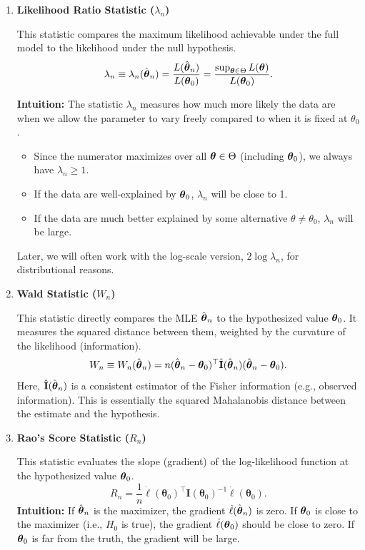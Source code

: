 \begin{enumerate}[label=\alph*)]
    \item \textbf{Likelihood Ratio Statistic ($\lambda_n$)}
    
    This statistic compares the maximum likelihood achievable under the full model to the likelihood under the null hypothesis.
    \[ \lambda_n \equiv \lambda_n(\hat{\boldsymbol{\theta}}_n) = \frac{L(\hat{\boldsymbol{\theta}}_n)}{L(\boldsymbol{\theta}_0)} = \frac{\sup_{\boldsymbol{\theta} \in \Theta} L(\boldsymbol{\theta})}{L(\boldsymbol{\theta}_0)}. \]
    
    \textbf{Intuition:} The statistic $\lambda_n$ measures how much more likely the data are when we allow the parameter to vary freely compared to when it is fixed at $\theta_0$.
    \begin{itemize}
        \item Since the numerator maximizes over all $\boldsymbol{\theta} \in \Theta$ (including $\boldsymbol{\theta}_0$), we always have $\lambda_n \ge 1$.
        \item If the data are well-explained by $\boldsymbol{\theta}_0$, $\lambda_n$ will be close to 1.
        \item If the data are much better explained by some alternative $\theta \neq \theta_0$, $\lambda_n$ will be large.
    \end{itemize}
    Later, we will often work with the log-scale version, $2 \log \lambda_n$, for distributional reasons.

    \item \textbf{Wald Statistic ($W_n$)}
    
    This statistic directly compares the MLE $\hat{\boldsymbol{\theta}}_n$ to the hypothesized value $\boldsymbol{\theta}_0$. It measures the squared distance between them, weighted by the curvature of the likelihood (information).
    \[ W_n \equiv W_n(\hat{\boldsymbol{\theta}}_n) = n(\hat{\boldsymbol{\theta}}_n - \boldsymbol{\theta}_0)^{\top} \hat{\mathbf{I}}(\hat{\boldsymbol{\theta}}_n)(\hat{\boldsymbol{\theta}}_n - \boldsymbol{\theta}_0). \]
    Here, $\hat{\mathbf{I}}(\hat{\boldsymbol{\theta}}_n)$ is a consistent estimator of the Fisher information (e.g., observed information). This is essentially the squared Mahalanobis distance between the estimate and the hypothesis.

    \item \textbf{Rao's Score Statistic ($R_n$)}
    
    This statistic evaluates the slope (gradient) of the log-likelihood function at the hypothesized value $\boldsymbol{\theta}_0$.
    \[ R_n = \frac{1}{n} \dot{\ell}(\boldsymbol{\theta}_0)^{\top} \mathbf{I}(\boldsymbol{\theta}_0)^{-1} \dot{\ell}(\boldsymbol{\theta}_0). \]
    \textbf{Intuition:} If $\hat{\boldsymbol{\theta}}_n$ is the maximizer, the gradient $\dot{\ell}(\hat{\boldsymbol{\theta}}_n)$ is zero. If $\boldsymbol{\theta}_0$ is close to the maximizer (i.e., $H_0$ is true), the gradient $\dot{\ell}(\boldsymbol{\theta}_0)$ should be close to zero. If $\boldsymbol{\theta}_0$ is far from the truth, the gradient will be large.
\end{enumerate}



